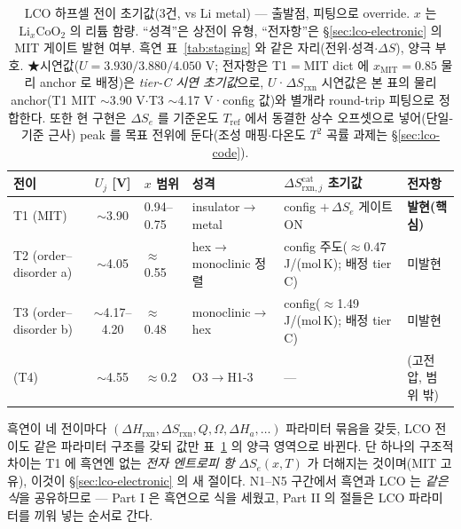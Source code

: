 \documentclass[11pt,a4paper]{article}
\newcommand{\rxn}{\mathrm{rxn}}
\begin{document}
\begin{table}[t]
\centering\footnotesize
\renewcommand{\arraystretch}{1.3}
\caption{LCO 하프셀 전이 초기값(3건, vs Li metal) — 출발점, 피팅으로 override. $x$ 는
$\mathrm{Li}_x\mathrm{CoO_2}$ 의 리튬 함량. ``성격''은 상전이 유형, ``전자항''은 \S\ref{sec:lco-electronic} 의 MIT
게이트 발현 여부. 흑연 표~\ref{tab:staging} 와 같은 자리(전위$\cdot$성격$\cdot\Delta S$), 양극 부호.
★시연값($U{=}3.930/3.880/4.050$ V; 전자항은 T1$=$MIT dict 에
$x_\mathrm{MIT}{=}0.85$ 물리 anchor 로 배정)은
\emph{tier-C 시연 초기값}으로, $U$·$\Delta S_\rxn$ 시연값은 본 표의 물리 anchor(T1 MIT $\sim$3.90 V$\cdot$T3 $\sim$4.17 V·config 값)와
별개라 round-trip 피팅으로 정합한다. 또한 현 구현은 $\Delta S_e$ 를 기준온도 $T_\mathrm{ref}$ 에서
동결한 상수 오프셋으로 넣어(단일-기준 근사) peak 를 목표 전위에 둔다(조성 매핑$\cdot$다온도 $T^2$ 곡률
과제는 \S\ref{sec:lco-code}).}
\label{tab:lco-staging}
\begin{tabular}{@{}p{} c p{} p{} p{} p{}@{}}
\toprule
전이 & $U_j$ [V] & $x$ 범위 & 성격 & $\Delta S_{\rxn,j}^\mathrm{cat}$ 초기값 & 전자항 \\
\midrule
T1 (MIT)              & $\sim$3.90        & 0.94--0.75 & insulator$\to$metal       & config $+\,\Delta S_e$ 게이트 ON & \textbf{발현(핵심)} \\
T2 (order--disorder a)& $\sim$4.05        & $\approx$0.55 & hex$\to$monoclinic 정렬 & config 주도($\approx$0.47 J/(mol\,K); 배정 tier C) & 미발현 \\
T3 (order--disorder b)& $\sim$4.17--4.20  & $\approx$0.48 & monoclinic$\to$hex      & config($\approx$1.49 J/(mol\,K); 배정 tier C) & 미발현 \\
\midrule
(T4)                  & $\sim$4.55        & $\approx$0.2 & O3$\to$H1-3              & --- & (고전압, 범위 밖) \\
\bottomrule
\end{tabular}
\end{table}

흑연이 네 전이마다 $(\Delta H_\rxn,\Delta S_\rxn,Q,\Omega,\Delta H_a,\dots)$ 파라미터 묶음을 갖듯,
LCO 전이도 같은 파라미터 구조를 갖되 값만 표~\ref{tab:lco-staging} 의 양극 영역으로 바뀐다. 단 하나의 구조적 차이는 T1 에
흑연엔 없는 \emph{전자 엔트로피 항} $\Delta S_e(x,T)$ 가 더해지는 것이며(MIT 고유), 이것이 \S\ref{sec:lco-electronic}
의 새 절이다. N1--N5 구간에서 흑연과 LCO 는 \emph{같은 식}을 공유하므로 --- Part I 은 흑연으로 식을 세웠고,
Part II 의 절들은 LCO 파라미터를 끼워 넣는 순서로 간다.
\end{document}
